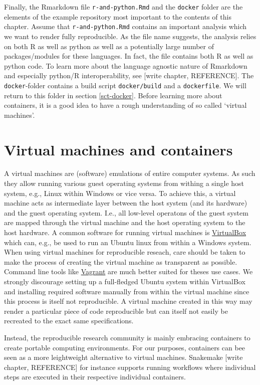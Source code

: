 \documentclass[]{book}
\begin{document}
Finally, the Rmarkdown file \texttt{r-and-python.Rmd} and the
\texttt{docker} folder are the elements of the example repository most
important to the contents of this chapter. Assume that
\texttt{r-and-python.Rmd} contains an important analysis which we want
to render fully reproducible. As the file name suggests, the analysis
relies on both R as well as python as well as a potentially large number
of packages/modules for these languages. In fact, the file contains both
R as well as python code. To learn more about the language agnostic
nature of Rmarkdown and especially python/R interoperability, see
{[}write chapter, REFERENCE{]}. The \texttt{docker}-folder contains a
build script \texttt{docker/build} and a \texttt{dockerfile}. We will
return to this folder in section \ref{sct-docker}. Before learning more
about containers, it is a good idea to have a rough understanding of so
called `virtual machines'.

\section{Virtual machines and
containers}\label{virtual-machines-and-containers}

A virtual machines are (software) emulations of entire computer systems.
As such they allow running various guest operating systems from withing
a single host system, e.g., Linux within Windows or vice versa. To
achieve this, a virtual machine acts as intermediate layer between the
host system (and its hardware) and the guest operating system. I.e., all
low-level operatons of the guest system are mapped through the virtual
machine and the host operating system to the host hardware. A common
software for running virtual machines is
\href{https://www.virtualbox.org/}{VirtualBox} which can, e.g., be used
to run an Ubuntu linux from within a Windows system. When using virtual
machines for reproducible reseach, care should be taken to make the
process of creating the virtual machine as transparent as possible.
Command line tools like \href{https://www.vagrantup.com/}{Vagrant} are
much better suited for theses use cases. We strongly discourage setting
up a full-fledged Ubuntu system within VirtualBox and installing
required software manually from within the virtual machine since this
process is itself not reproducible. A virtual machine created in this
way may render a particular piece of code reproducible but can itself
not easily be recreated to the exact same specifications.

Instead, the reproducible research community is mainly embracing
containers to create portable computing environments. For our purposes,
containers can bee seen as a more leightweight alternative to virtual
machines. Snakemake {[}write chapter, REFERENCE{]} for instance supports
running workflows where individual steps are executed in their
respective individual containers.
\end{document}
